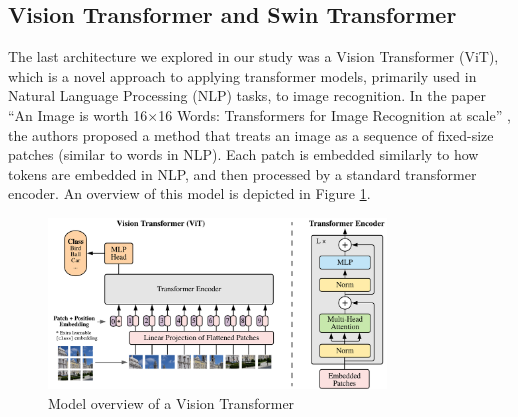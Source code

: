 \subsection{Vision Transformer and Swin Transformer}

The last architecture we explored in our study was a Vision Transformer (ViT), which is a novel approach to applying transformer models, primarily used in Natural Language Processing (NLP) tasks, to image recognition. In the paper ``An Image is worth 16$\times$16 Words: Transformers for Image Recognition at scale'' \cite{DBLP:journals/corr/abs-2010-11929}, the authors proposed a method that treats an image as a sequence of fixed-size patches (similar to words in NLP). Each patch is embedded similarly to how tokens are embedded in NLP, and then processed by a standard transformer encoder. An overview of this model is depicted in Figure \ref{fig:vit-arch}.

\begin{figure}
    \centering 
    \includegraphics[width=0.8\textwidth]{model_scheme.pdf}
    \caption{Model overview of a Vision Transformer \cite{DBLP:journals/corr/RonnebergerFB15}}
    \label{fig:vit-arch}
\end{figure}

